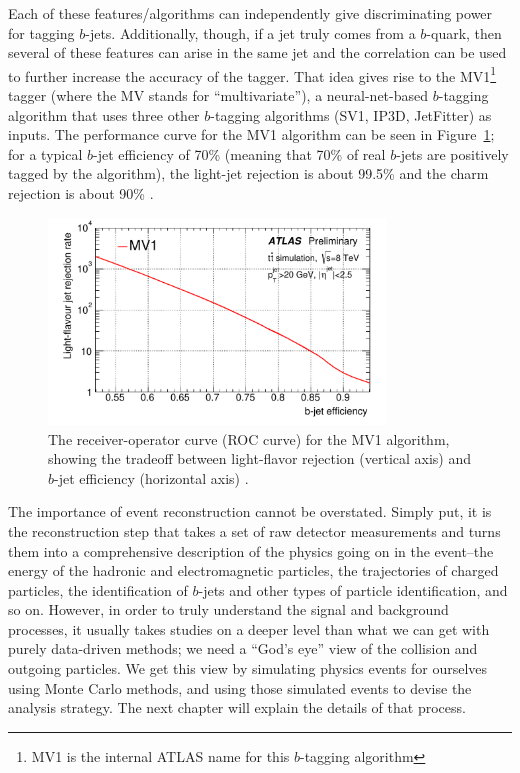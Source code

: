 Each of these features/algorithms can independently give discriminating power for tagging $b$-jets.
Additionally, though, if a jet truly comes from a $b$-quark, then several of these features can arise in the 
same jet and the correlation can be used to further increase the accuracy of the tagger.  That idea gives 
rise to the MV1\footnote{MV1 is the internal ATLAS name for this $b$-tagging algorithm} 
tagger (where the MV stands for ``multivariate''), a neural-net-based 
$b$-tagging algorithm that uses three other $b$-tagging algorithms (SV1, IP3D, JetFitter) 
as inputs.   The performance curve for the MV1 algorithm can be seen in Figure~\ref{fig:mv1_roc}; 
for a typical $b$-jet efficiency of 70\% (meaning that 70\% of real $b$-jets 
are positively tagged by the algorithm), the light-jet rejection is about 99.5\% and the 
charm rejection is about 90\% \cite{b-tagging}.


\begin{figure}
    \center
	\includegraphics[width=0.8\textwidth]{ReconstructionPerformance/images/mv1_roc.pdf}
	\caption{The receiver-operator curve (ROC curve) for the MV1 algorithm, showing the tradeoff
    between light-flavor rejection (vertical axis) and $b$-jet efficiency (horizontal axis)
     \cite{b-tagging}.	\label{fig:mv1_roc}  }
\end{figure}


The importance of event reconstruction cannot be overstated.  Simply 
put, it is the reconstruction step that takes a set of raw detector 
measurements and turns them into a comprehensive description of the 
physics going on in the event--the energy of the hadronic and electromagnetic
particles, the trajectories of charged particles, the identification of 
$b$-jets and other types of particle identification, and so on.  However,
in order to truly understand the signal and background processes, it usually
takes studies on a deeper level than what we can get with purely data-driven methods;
we need a ``God's eye'' view of the collision and outgoing particles.  
We get this view by simulating physics events for ourselves using Monte Carlo
methods, and using those simulated events to devise the analysis strategy.
The next chapter will explain the details of that process.












